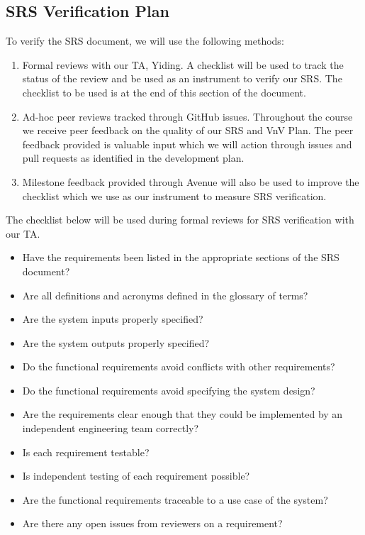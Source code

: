 \documentclass[12pt, titlepage]{article}
\begin{document}
\subsection{SRS Verification Plan}

To verify the SRS document, we will use the following methods:
\begin{enumerate}
  \item Formal reviews with our TA, Yiding. A checklist will be used to track
    the status of the review and be used as an instrument to verify our SRS.
    The checklist to be used is at the end of this section of the document.
  \item Ad-hoc peer reviews tracked through GitHub issues. Throughout the
    course we receive peer feedback on the quality of our SRS and VnV Plan. The
    peer feedback provided is valuable input which we will action through issues
    and pull requests as identified in the development plan.
  \item Milestone feedback provided through Avenue will also be used to
    improve the checklist which we use as our instrument to measure
    SRS verification.
\end{enumerate}
The checklist below will be used during formal reviews for SRS verification
with our TA.
\begin{itemize}
  \item Have the requirements been listed in the appropriate sections of the
    SRS document?
  \item Are all definitions and acronyms defined in the glossary of terms?
  \item Are the system inputs properly specified?
  \item Are the system outputs properly specified?
  \item Do the functional requirements avoid conflicts with other requirements?
  \item Do the functional requirements avoid specifying the system design?
  \item Are the requirements clear enough that they could be implemented by an
    independent engineering team correctly?
  \item Is each requirement testable?
  \item Is independent testing of each requirement possible?
  \item Are the functional requirements traceable to a use case of the system?
  \item Are there any open issues from reviewers on a requirement?
\end{itemize}
\end{document}
